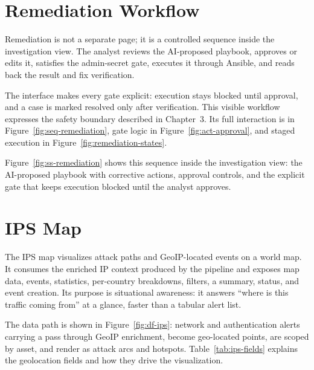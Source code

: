 
\section{Remediation Workflow}

Remediation is not a separate page; it is a controlled sequence inside the investigation view. The analyst reviews the AI-proposed playbook, approves or edits it, satisfies the admin-secret gate, executes it through Ansible, and reads back the result and fix verification.

The interface makes every gate explicit: execution stays blocked until approval, and a case is marked resolved only after verification. This visible workflow expresses the safety boundary described in Chapter~3. Its full interaction is in Figure~\ref{fig:seq-remediation}, gate logic in Figure~\ref{fig:act-approval}, and staged execution in Figure~\ref{fig:remediation-states}.

Figure~\ref{fig:ss-remediation} shows this sequence inside the investigation view: the AI-proposed playbook with corrective actions, approval controls, and the explicit gate that keeps execution blocked until the analyst approves.


\section{IPS Map}

The IPS map visualizes attack paths and GeoIP-located events on a world map. It consumes the enriched IP context produced by the pipeline and exposes map data, events, statistics, per-country breakdowns, filters, a summary, status, and event creation. Its purpose is situational awareness: it answers ``where is this traffic coming from'' at a glance, faster than a tabular alert list.


The data path is shown in Figure~\ref{fig:df-ips}: network and authentication alerts carrying a  pass through GeoIP enrichment, become geo-located points, are scoped by asset, and render as attack arcs and hotspots. Table~\ref{tab:ips-fields} explains the geolocation fields and how they drive the visualization.


